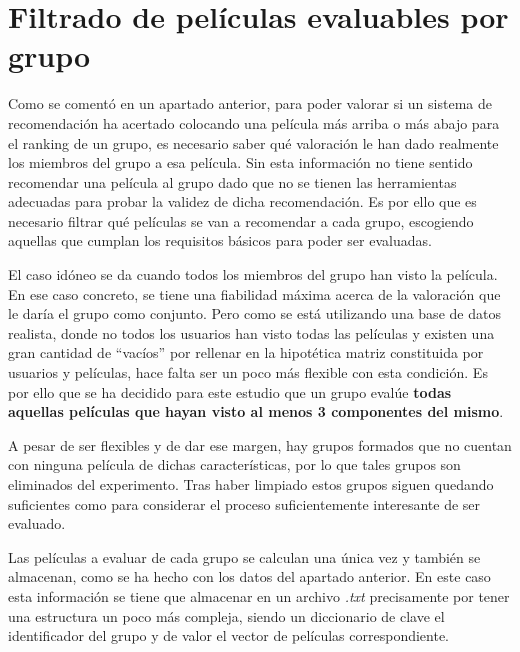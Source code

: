 \section{Filtrado de películas evaluables por grupo}

Como se comentó en un apartado anterior, para poder valorar si un sistema de recomendación ha acertado colocando una película más arriba o más abajo para el ranking de un grupo, es necesario saber qué valoración le han dado realmente los miembros del grupo a esa película. Sin esta información no tiene sentido recomendar una película al grupo dado que no se tienen las herramientas adecuadas para probar la validez de dicha recomendación. Es por ello que es necesario filtrar qué películas se van a recomendar a cada grupo, escogiendo aquellas que cumplan los requisitos básicos para poder ser evaluadas.

El caso idóneo se da cuando todos los miembros del grupo han visto la película. En ese caso concreto, se tiene una fiabilidad máxima acerca de la valoración que le daría el grupo como conjunto. Pero como se está utilizando una base de datos realista, donde no todos los usuarios han visto todas las películas y existen una gran cantidad de ``vacíos'' por rellenar en la hipotética matriz constituida por usuarios y películas, hace falta ser un poco más flexible con esta condición. Es por ello que se ha decidido para este estudio que un grupo evalúe \textbf{todas aquellas películas que hayan visto al menos 3 componentes del mismo}.

A pesar de ser flexibles y de dar ese margen, hay grupos formados que no cuentan con ninguna película de dichas características, por lo que tales grupos son eliminados del experimento. Tras haber limpiado estos grupos siguen quedando suficientes como para considerar el proceso suficientemente interesante de ser evaluado.

Las películas a evaluar de cada grupo se calculan una única vez y también se almacenan, como se ha hecho con los datos del apartado anterior. En este caso esta información se tiene que almacenar en un archivo \textit{.txt} precisamente por tener una estructura un poco más compleja, siendo un diccionario de clave el identificador del grupo y de valor el vector de películas correspondiente.